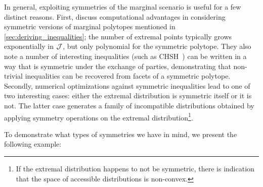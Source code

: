 \documentclass[aps, 10pt, english, twoside, pra, nofootinbib, tightenlines, longbibliography]{revtex4-1}
\begin{document}
    In general, exploiting symmetries of the marginal scenario is useful for a few distinct reasons. First, \citet{Bancal_2010} discuss computational advantages in considering symmetric versions of marginal polytopes mentioned in \cref{sec:deriving_inequalities}; the number of extremal points typically grows exponentially in $\mathcal{J}$, but only polynomial for the symmetric polytope. They also note a number of interesting inequalities (such as CHSH~\cite{CHSH_Original}) can be written in a way that is symmetric under the exchange of parties, demonstrating that non-trivial inequalities can be recovered from facets of a symmetric polytope. Secondly, numerical optimizations against symmetric inequalities lead to one of two interesting cases: either the extremal distribution is symmetric itself or it is not. The latter case generates a family of incompatible distributions obtained by applying symmetry operations on the extremal distribution\footnote{If the extremal distribution happens to not be symmetric, there is indication that the space of accessible distributions is non-convex.}.

    To demonstrate what types of symmetries we have in mind, we present the following example:
\end{document}
